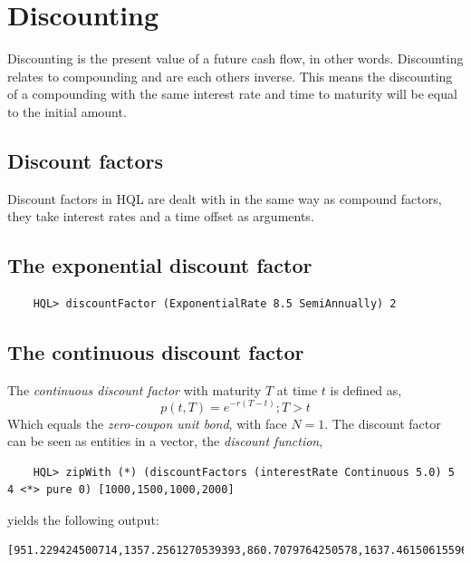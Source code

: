 \documentclass[11pt,a4paper]{article}
\numberwithin{equation}{section}
\begin{document}

	\section{Discounting}
	Discounting is the present value of a future cash flow, in other words. Discounting relates to compounding and are each others inverse. This means
	the discounting of a compounding with the same interest rate and time to maturity will be equal to the initial amount.

	\subsection{Discount factors}
	Discount factors in HQL are dealt with in the same way as compound factors, they take interest rates and a time offset as arguments.

	\subsection{The exponential discount factor}

	\begin{lstlisting}
	HQL> discountFactor (ExponentialRate 8.5 SemiAnnually) 2
	\end{lstlisting}

	\subsection{The continuous discount factor}
	The \textit{continuous discount factor} with maturity $T$ at time $t$ is defined as,
	\[
	p(t,T)=e^{-r(T-t)}; T>t
	\]
	Which equals the \textit{zero-coupon unit bond}, with face $N=1$. The discount factor
	can be seen as entities in a vector, the \textit{discount function},

	\FrameSep
	\begin{lstlisting}
	HQL> zipWith (*) (discountFactors (interestRate Continuous 5.0) 5 4 <*> pure 0) [1000,1500,1000,2000]
	\end{lstlisting}
	\FrameSep
	yields the following output:
	\FrameSep
	\begin{lstlisting}[style=Output]
	[951.229424500714,1357.2561270539393,860.7079764250578,1637.4615061559637]
	\end{lstlisting}
	\FrameSep
\end{document}
